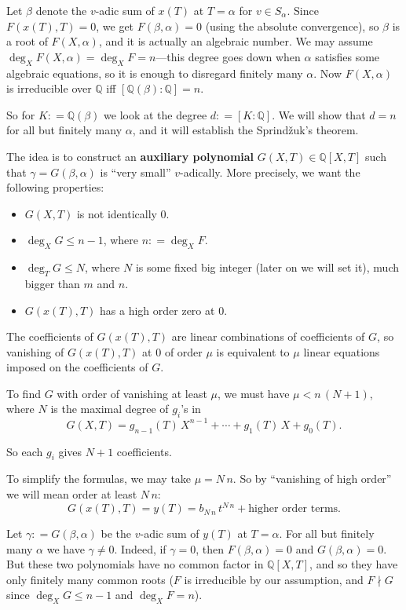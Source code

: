 \documentclass{article}
\newcommand{\term}{\textbf}
\newcommand{\dfn}{\mathrel{\mathop:}=}
\newcommand{\QQ}{\mathbb{Q}}
\theoremstyle{myplain}
\theoremstyle{mydefinition}
\begin{document}
Let $\beta$ denote the $v$-adic sum of $x (T)$ at $T = \alpha$ for
$v \in S_\alpha$. Since $F (x(T),T) = 0$, we get $F (\beta,\alpha) = 0$ (using
the absolute convergence), so $\beta$ is a root of $F (X, \alpha)$, and it is
actually an algebraic number. We may assume
$\deg_X F (X, \alpha) = \deg_X F = n$---this degree goes down when $\alpha$
satisfies some algebraic equations, so it is enough to disregard finitely many
$\alpha$. Now $F (X,\alpha)$ is irreducible over $\QQ$ iff
$[\QQ (\beta) : \QQ] = n$.

So for $K \dfn \QQ (\beta)$ we look at the degree $d \dfn [K : \QQ]$. We will
show that $d = n$ for all but finitely many $\alpha$, and it will establish the
Sprind\v{z}uk's theorem.

\vspace{1em}

The idea is to construct an \term{auxiliary polynomial} $G (X,T) \in \QQ [X,T]$
such that $\gamma = G (\beta,\alpha)$ is ``very small'' $v$-adically. More
precisely, we want the following properties:
\begin{itemize}
\item $G (X,T)$ is not identically $0$.

\item $\deg_X G \le n-1$, where $n \dfn \deg_X F$.

\item $\deg_T G \le N$, where $N$ is some fixed big integer (later on we will
  set it), much bigger than $m$ and $n$.

\item $G (x(T), T)$ has a high order zero at $0$.
\end{itemize}

The coefficients of $G (x(T), T)$ are linear combinations of coefficients of
$G$, so vanishing of $G (x(T), T)$ at $0$ of order $\mu$ is equivalent to $\mu$
linear equations imposed on the coefficients of $G$.

To find $G$ with order of vanishing at least $\mu$, we must have
$\mu < n \, (N+1)$, where $N$ is the maximal degree of $g_i$'s in
\[ G (X,T) = g_{n-1} (T)\,X^{n-1} + \cdots + g_1 (T)\,X + g_0 (T). \]

So each $g_i$ gives $N+1$ coefficients.

To simplify the formulas, we may take $\mu = N\,n$. So by ``vanishing of high
order'' we will mean order at least $N\,n$:
\[ G (x(T),T) = y(T) = b_{N\,n} \, t^{N\,n} + \text{higher order terms}. \]

Let $\gamma \dfn G (\beta,\alpha)$ be the $v$-adic sum of $y (T)$ at
$T = \alpha$. For all but finitely many $\alpha$ we have $\gamma \ne 0$. Indeed,
if $\gamma = 0$, then $F (\beta,\alpha) = 0$ and $G (\beta,\alpha) = 0$. But
these two polynomials have no common factor in $\QQ [X,T]$, and so they have
only finitely many common roots ($F$ is irreducible by our assumption, and
$F \nmid G$ since $\deg_X G \le n-1$ and $\deg_X F = n$).
\end{document}
